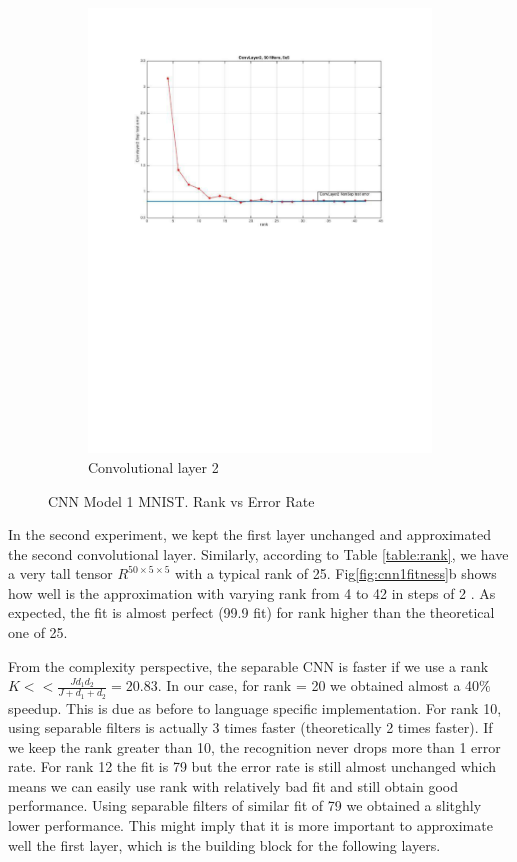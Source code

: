 \begin{figure}[h!]
\begin{subfigure}[b]{0.40\textwidth}
    \includegraphics[width=\textwidth]{images/imagesCNN_page1.pdf}
    \caption{Convolutional layer 2}
  \end{subfigure}
  \caption{CNN Model 1 MNIST. Rank vs Error Rate}
  \label{fig:cnn1error}
\end{figure}

In the second experiment, we kept the first layer unchanged and approximated the second convolutional layer.
Similarly, according to Table \ref{table:rank}, we have a very tall tensor $R^{50\times 5 \times 5}$ with a typical rank of 25.
Fig\ref{fig:cnn1fitness}b shows how well is the approximation with varying rank from 4 to 42 in steps of 2 . As expected, the fit is almost perfect (99.9 fit) for rank higher than the theoretical one of 25.

From the complexity perspective, the separable CNN is faster if we use a rank $K << \frac{Jd_{1}d_{2}}{J +d_{1}+d_{2}} = 20.83$. In our case, for rank = 20 we obtained almost a 40$\%$ speedup. This is due as before to language specific implementation.
For rank 10, using separable filters is actually 3 times faster (theoretically 2 times faster).
If we keep the rank greater than 10, the recognition never drops more than 1 error rate.
For rank 12 the fit is 79 but the error rate is still almost unchanged which means we can easily use rank with relatively bad fit and still obtain good performance. Using separable filters of similar fit of 79  we obtained a slitghly lower performance. This might imply that it is more important to approximate well the first layer, which is the building block for the following layers.
